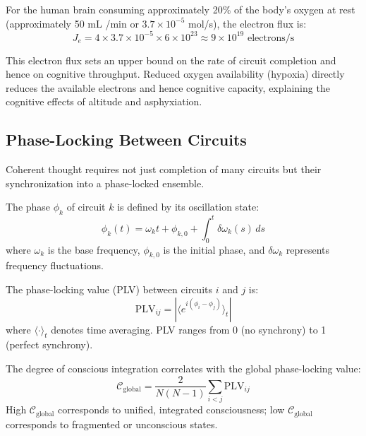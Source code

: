 For the human brain consuming approximately 20\% of the body's oxygen at rest (approximately 50 mL /min or $3.7 \times 10^{-5}$ mol/s), the electron flux is:
\begin{equation}
J_e = 4 \times 3.7 \times 10^{-5} \times 6 \times 10^{23} \approx 9 \times 10^{19} \text{ electrons/s}
\end{equation}

This electron flux sets an upper bound on the rate of circuit completion and hence on cognitive throughput. Reduced oxygen availability (hypoxia) directly reduces the available electrons and hence cognitive capacity, explaining the cognitive effects of altitude and asphyxiation.

\subsection{Phase-Locking Between Circuits}

Coherent thought requires not just completion of many circuits but their synchronization into a phase-locked ensemble.

\begin{definition}
\label{def:circuit_phase}
The phase $\phi_k$ of circuit $k$ is defined by its oscillation state:
\begin{equation}
\phi_k(t) = \omega_k t + \phi_{k,0} + \int_0^t \delta\omega_k(s) \, ds
\label{eq:circuit_phase_def}
\end{equation}
where $\omega_k$ is the base frequency, $\phi_{k,0}$ is the initial phase, and $\delta\omega_k$ represents frequency fluctuations.
\end{definition}

\begin{definition}
\label{def:plv}
The phase-locking value (PLV) between circuits $i$ and $j$ is:
\begin{equation}
\text{PLV}_{ij} = \left| \langle e^{i(\phi_i - \phi_j)} \rangle_t \right|
\label{eq:plv}
\end{equation}
where $\langle \cdot \rangle_t$ denotes time averaging. PLV ranges from 0 (no synchrony) to 1 (perfect synchrony).
\end{definition}

\begin{theorem}
\label{thm:coherence_consciousness}
The degree of conscious integration correlates with the global phase-locking value:
\begin{equation}
\mathcal{C}_{\text{global}} = \frac{2}{N(N-1)} \sum_{i < j} \text{PLV}_{ij}
\label{eq:global_coherence}
\end{equation}
High $\mathcal{C}_{\text{global}}$ corresponds to unified, integrated consciousness; low $\mathcal{C}_{\text{global}}$ corresponds to fragmented or unconscious states.
\end{theorem}

